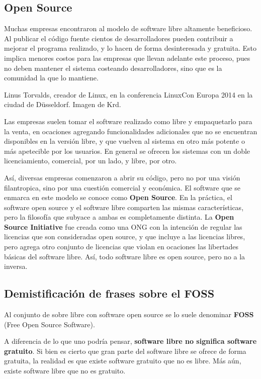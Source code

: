 \subsection{Open Source}

Muchas empresas encontraron al modelo de software libre altamente beneficioso.
Al publicar el código fuente cientos de desarrolladores pueden contribuir a
mejorar el programa realizado, y lo hacen de forma desinteresada y gratuita.
Esto implica menores costos para las empresas que llevan adelante este proceso,
pues no deben mantener el sistema costeando desarrolladores, sino que es la
comunidad la que lo mantiene.

{Linus Torvalds, creador de Linux, en la conferencia LinuxCon Europa 2014 en la
ciudad de Düsseldorf.}
{Imagen de Krd.}

Las empresas suelen tomar el software realizado como libre y empaquetarlo para
la venta, en ocaciones agregando funcionalidades adicionales que no se encuentran
disponibles en la versión libre, y que vuelven al sistema en otro más potente o
más apetecible por los usuarios. En general se ofrecen los sistemas con un
doble licenciamiento, comercial, por un lado, y libre, por otro.

Así, diversas empresas comenzaron a abrir su código, pero no por una visión
filantropica, sino por una cuestión comercial y económica. El software que
se enmarca en este modelo se conoce como \textbf{Open Source}. En la práctica,
el software open source y el software libre comparten las mismas
características, pero la filosofía que subyace a ambas es completamente distinta.
La \textbf{Open Source Initiative} fue creada como una ONG con la intención de
regular las licencias que son consideradas open source, y que incluye a las
licencias libres, pero agrega otro conjunto de licencias que violan en ocaciones
las libertades básicas del software libre. Así, todo software libre es open source,
pero no a la inversa.

\subsection{Demistificación de frases sobre el FOSS}

Al conjunto de sobre libre con software open source se lo suele denominar
\textbf{FOSS} (Free Open Source Software).

A diferencia de lo que uno podría pensar, \textbf{software libre no significa
software gratuito}. Si bien es cierto que gran parte del software libre se ofrece
de forma gratuita, la realidad es que existe software gratuito que no es libre.
Más aún, existe software libre que no es gratuito.

